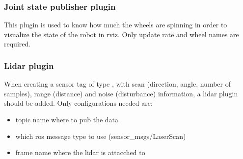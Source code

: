 \subsubsection{Joint state publisher plugin}

This plugin is used to know how much the wheels are spinning in order to visualize the state of the robot in \Acrshort{rviz}. Only update rate and wheel names are required.

\subsubsection{Lidar plugin}

When creating a sensor tag of type , with scan (direction, angle, number of samples), range (distance) and noise (disturbance) information, a lidar plugin should be added. Only configurations needed are:
\begin{itemize}
    \item topic name where to pub the data
    \item which \Acrshort{ros} message type to use (sensor\_msgs/LaserScan)
    \item frame name where the lidar is attacched to
\end{itemize}